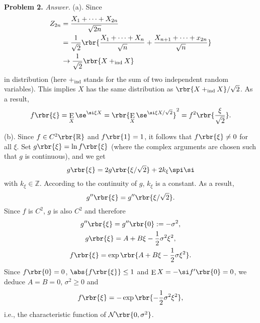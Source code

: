 \documentclass[english, nochinese]{pnote}
\DeclareMathOperator\ope{\mathrm{E}}
\begin{document}
\textbf{Problem 2.} \textit{Answer.} (a). Since
\begin{equation}
\begin{split}
Z_{ 2 n } &= \frac{ X_1 + \cdots + X_{ 2 n } }{\sqrt{ 2 n }} \\
&= \frac{1}{\sqrt{2}} \rbr{ \frac{ X_1 + \cdots + X_n }{\sqrt{n}} + \frac{ X_{ n + 1 } + \cdots + x_{ 2 n } }{\sqrt{n}} } \\
&\rightarrow \frac{1}{\sqrt{2}} \rbr{ X +_{\text{ind}} X }
\end{split}
\end{equation}
in distribution (here $+_{\text{ind}}$ stands for the sum of two independent random variables). This implies $X$ has the same distribution as $ \rbr{ X +_{\text{ind}} X } / \sqrt{2} $. As a result,
\begin{equation}
f \rbr{\xi} = \ope_X \se^{ \si \xi X } = \rbr{ \ope_X \se^{ \si \xi X / \sqrt{2} } }^2 = f^2 \rbr{\frac{\xi}{\sqrt{2}}}.
\end{equation}

(b). Since $ f \in C^2 \rbr{\mathbb{R}} $ and $ f \rbr{1} = 1 $, it follows that $ f \rbr{\xi} \neq 0 $ for all $\xi$. Set $ g \rbr{\xi} = \ln f \rbr{\xi} $ (where the complex arguments are chosen such that $g$ is continuous), and we get
\begin{equation}
g \rbr{\xi} = 2 g \rbr{ \xi / \sqrt{2} } + 2 k_{\xi} \spi \si
\end{equation}
with $ k_{\xi} \in \mathbb{Z} $. According to the continuity of $g$, $k_{\xi}$ is a constant. As a result,  
\begin{equation}
g'' \rbr{\xi} = g'' \rbr{ \xi / \sqrt{2} }.
\end{equation}
Since $f$ is $C^2$, $g$ is also $C^2$ and therefore
\begin{gather}
g'' \rbr{\xi} = g'' \rbr{0} := -\sigma^2, \\
g \rbr{\xi} = A + B \xi - \frac{1}{2} \sigma^2 \xi^2, \\
f \rbr{\xi} = \exp \rbr{ A + B \xi - \frac{1}{2} \sigma \xi^2 }.
\end{gather}
Since $ f \rbr{0} = 0 $, $ \abs{ f \rbr{\xi} } \le 1 $ and $ \ope X = -\si f' \rbr{0} = 0 $, we deduce $ A = B = 0 $, $ \sigma^2 \ge 0 $ and
\begin{equation}
f \rbr{\xi} = -\exp \rbr{ -\frac{1}{2} \sigma^2 \xi^2 },
\end{equation}
i.e., the characteristic function of $ \mathcal{N} \rbr{ 0, \sigma^2 } $.
\end{document}
